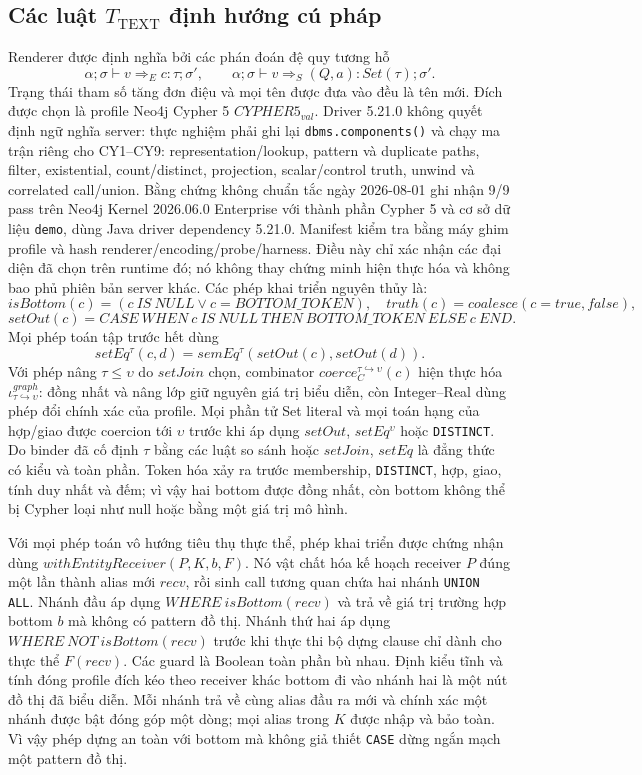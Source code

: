 \documentclass[11pt,a4paper]{article}
\theoremstyle{definition}
\begin{document}
\subsection{Các luật $T_{\mathrm{TEXT}}$ định hướng cú pháp}

Renderer được định nghĩa bởi các phán đoán đệ quy tương hỗ
\[
\alpha;\sigma\vdash v\Rightarrow_E c:\tau;\sigma',
\qquad
\alpha;\sigma\vdash v\Rightarrow_S(Q,a):Set(\tau);\sigma'.
\]
Trạng thái tham số tăng đơn điệu và mọi tên được đưa vào đều là tên mới. Đích
được chọn là profile Neo4j Cypher 5 $CYPHER5_{val}$. Driver 5.21.0 không quyết
định ngữ nghĩa server: thực nghiệm phải ghi lại \texttt{dbms.components()} và
chạy ma trận riêng cho CY1--CY9: representation/lookup, pattern và duplicate
paths, filter, existential, count/distinct, projection, scalar/control truth,
unwind và correlated call/union. Bằng chứng không chuẩn tắc ngày 2026-08-01 ghi
nhận 9/9 pass trên Neo4j Kernel 2026.06.0 Enterprise với thành phần Cypher 5 và
cơ sở dữ liệu \texttt{demo}, dùng Java driver dependency 5.21.0. Manifest kiểm
tra bằng máy ghim profile và hash renderer/encoding/probe/harness. Điều này chỉ
xác nhận các đại diện đã chọn trên runtime đó; nó không thay chứng minh hiện
thực hóa và không bao phủ phiên bản server khác. Các phép khai triển nguyên
thủy là:
\[
isBottom(c)=(c\ IS\ NULL\lor c=BOTTOM\_TOKEN),\quad
truth(c)=coalesce(c=true,false),
\]
\[
setOut(c)=CASE\ WHEN\ c\ IS\ NULL\ THEN\ BOTTOM\_TOKEN\ ELSE\ c\ END.
\]
Mọi phép toán tập trước hết dùng
\[
setEq^{\tau}(c,d)=semEq^{\tau}(setOut(c),setOut(d)).
\]
Với phép nâng $\tau\leq\upsilon$ do $setJoin$ chọn, combinator
$coerce_C^{\tau\hookrightarrow\upsilon}(c)$ hiện thực hóa
$\iota^{graph}_{\tau\hookrightarrow\upsilon}$: đồng nhất và nâng lớp giữ nguyên
giá trị biểu diễn, còn Integer--Real dùng phép đổi chính xác của profile. Mọi
phần tử Set literal và mọi toán hạng của hợp/giao được coercion tới $\upsilon$
trước khi áp dụng $setOut$, $setEq^{\upsilon}$ hoặc \texttt{DISTINCT}.
Do binder đã cố định $\tau$ bằng các luật so sánh hoặc $setJoin$, $setEq$ là
đẳng thức có kiểu và toàn phần. Token hóa xảy ra trước membership,
\texttt{DISTINCT}, hợp, giao, tính duy nhất và đếm; vì vậy hai bottom được đồng
nhất, còn bottom không thể bị Cypher loại như null hoặc bằng một giá trị mô hình.

Với mọi phép toán vô hướng tiêu thụ thực thể, phép khai triển được chứng nhận
dùng $withEntityReceiver(P,K,b,F)$. Nó vật chất hóa kế hoạch receiver $P$ đúng
một lần thành alias mới $recv$, rồi sinh call tương quan chứa hai nhánh
\texttt{UNION ALL}. Nhánh đầu áp dụng $WHERE\ isBottom(recv)$ và trả về giá trị
trường hợp bottom $b$ mà không có pattern đồ thị. Nhánh thứ hai áp dụng
$WHERE\ NOT\ isBottom(recv)$ trước khi thực thi bộ dựng clause chỉ dành cho
thực thể $F(recv)$. Các guard là Boolean toàn phần bù nhau. Định kiểu tĩnh và
tính đóng profile đích kéo theo receiver khác bottom đi vào nhánh hai là một
nút đồ thị đã biểu diễn. Mỗi nhánh trả về cùng alias đầu ra mới và chính xác
một nhánh được bật đóng góp một dòng; mọi alias trong $K$ được nhập và bảo
toàn. Vì vậy phép dựng an toàn với bottom mà không giả thiết \texttt{CASE} dừng
ngắn mạch một pattern đồ thị.
\end{document}
